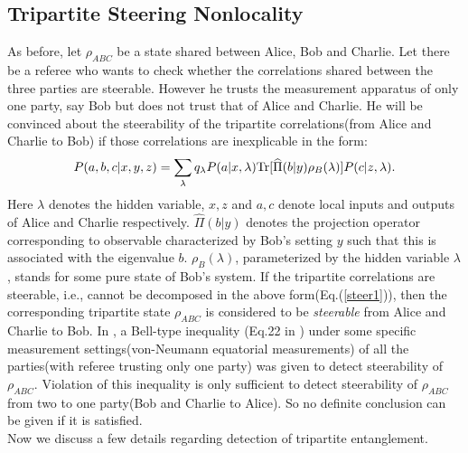 \documentclass[pra,10pt,twocolumn,superscriptaddress,floatfix,showpacs]{revtex4-1}
\begin{document}
\subsection{Tripartite Steering Nonlocality}
As before, let $\rho_{ABC}$ be a state shared between Alice, Bob and Charlie. Let there be a referee who wants to check whether the correlations shared between the three parties are steerable. However he trusts the measurement apparatus of only one party, say Bob but does not trust that of Alice and Charlie. He will be convinced about the steerability of the tripartite correlations(from Alice and Charlie to Bob) if those correlations are inexplicable in the form:
\begin{equation}\label{steer1}
P(a,b,c|x,y,z)=\sum_{\lambda} q_{\lambda}P(a|x,\lambda)\textmd{Tr}[\widehat{\Pi}(b|y)\rho_{B}(\lambda)]P(c|z,\lambda).
\end{equation}
 Here $\lambda$ denotes the hidden variable, $x,z$ and $a,c$ denote local inputs and outputs of Alice and Charlie respectively. $\widehat{\Pi}(b|y)$ denotes the projection operator corresponding to observable
characterized  by  Bob's setting $y$ such that this is associated with the eigenvalue $b$. $\rho_{B}(\lambda)$, parameterized by the hidden variable $\lambda$,  stands for some pure state of Bob's system. If the tripartite correlations are steerable, i.e., cannot be decomposed in the above form(Eq.(\ref{steer1})), then the corresponding tripartite state $\rho_{ABC}$ is considered to be \textit{steerable} from Alice and Charlie to Bob. In \cite{caval1}, a Bell-type inequality (Eq.22 in \cite{caval1}) under some specific measurement settings(von-Neumann equatorial measurements) of all the parties(with referee trusting only one party) was given to detect steerability of $\rho_{ABC}$. Violation of this inequality is only sufficient to detect steerability of $\rho_{ABC}$ from two to one party(Bob and Charlie to Alice). So no definite conclusion can be given if it is satisfied.\\
Now we discuss a few details regarding detection of tripartite entanglement.
\end{document}
